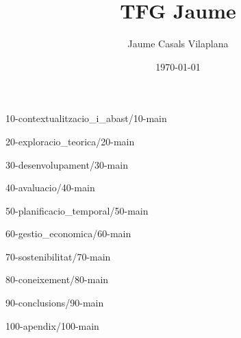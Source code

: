 \documentclass[a4paper, 12pt]{report}
\title{TFG Jaume}
\author{Jaume Casals Vilaplana}
\date{\today}
\begin{document}

\clearpage


\clearpage


\clearpage

{10-contextualitzacio_i_abast/10-main}
\clearpage

{20-exploracio_teorica/20-main}
\clearpage

{30-desenvolupament/30-main}
\clearpage

{40-avaluacio/40-main}
\clearpage

{50-planificacio_temporal/50-main}
\clearpage

{60-gestio_economica/60-main}
\clearpage

{70-sostenibilitat/70-main}
\clearpage

{80-coneixement/80-main}
\clearpage

{90-conclusions/90-main}
\clearpage

{100-apendix/100-main}
\clearpage

\appendix

\printbibliography[title={Referències}]

\afterpage{\null\newpage}
\end{document}
